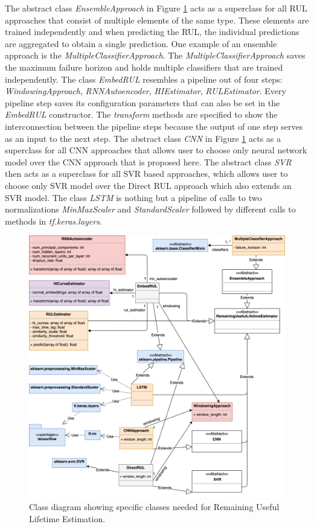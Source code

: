 The abstract class \textit{EnsembleApproach} in Figure \ref{fig:rul_class} acts as a superclass for all RUL approaches that consist of multiple elements of the same type. These elements are trained independently and when predicting the RUL, the individual predictions are aggregated to obtain a single prediction. One example of an ensemble approach is the \textit{MultipleClassifierApproach}. The \textit{MultipleClassifierApproach} saves the maximum failure horizon and holds multiple classifiers that are trained independently. The class \textit{EmbedRUL} resembles a pipeline out of four steps: \textit{WindowingApproach}, \textit{RNNAutoencoder}, \textit{HIEstimator}, \textit{RULEstimator}. Every pipeline step saves its configuration parameters that can also be set in the \textit{EmbedRUL} constructor. The \textit{transform} methods are specified to show the interconnection between the pipeline steps because the output of one step serves as an input to the next step. The abstract class \textit{CNN} in Figure \ref{fig:rul_class} acts as a superclass for all CNN approaches that allows user to choose only neural network model over the CNN approach that is proposed here. The abstract class \textit{SVR} then acts as a superclass for all SVR based approaches, which allows user to choose only SVR model over the Direct RUL approach which also extends an SVR model. The class \textit{LSTM} is nothing but a pipeline of calls to two normalizations \textit{MinMaxScaler} and \textit{StandardScaler} followed by different calls to methods in \textit{tf.keras.layers}.
\begin{figure}[H]
    \centering
    \includegraphics[width=\textwidth]{gfx/rul_class}
    \caption{Class diagram showing specific classes needed for Remaining Useful Lifetime Estimation.}
    \label{fig:rul_class}
\end{figure}

